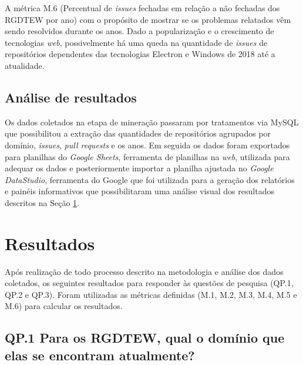 \documentclass[12pt]{article}
\begin{document}
A métrica M.6 (Percentual de \textit{issues} fechadas em relação a não fechadas dos RGDTEW por ano) com o propósito de mostrar se os problemas relatados vêm sendo resolvidos durante os anos. Dado a popularização e o crescimento de tecnologias \textit{web}, possivelmente há uma queda na quantidade de \textit{issues} de repositórios dependentes das tecnologias Electron e Windows de 2018 até a atualidade.

\subsection{Análise de resultados} 

Os dados coletados na etapa de mineração passaram por tratamentos via MySQL que possibilitou a extração das quantidades de repositórios agrupados por domínio, \textit{issues}, \textit{pull requests} e os anos. Em seguida os dados foram exportados para planilhas do \emph{Google Sheets}, ferramenta de planilhas na \textit{web}, utilizada para adequar os dados e posteriormente importar a planilha ajustada no \emph{Google DataStudio}, ferramenta do Google que foi utilizada para a geração dos relatórios e painéis informativos que possibilitaram uma análise visual dos resultados descritos na Seção \ref{resultados}.

\section{Resultados} \label{resultados}

Após realização de todo processo descrito na metodologia e análise dos dados coletados, os seguintes resultados para responder às questões de pesquisa (QP.1, QP.2 e QP.3). Foram utilizadas as métricas definidas (M.1, M.2, M.3, M.4, M.5 e M.6) para calcular os resultados.

\subsection{QP.1 Para os RGDTEW, qual o domínio que elas se encontram atualmente?}
\end{document}
